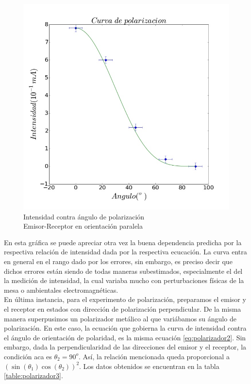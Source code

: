 \documentclass[%
 reprint,
 amsmath,amssymb,
 aps,
]{revtex4-1}
\begin{document}
\begin{figure}[h!]
\centering
\includegraphics[width=0.8\linewidth]{polarizador2}
\caption{Intensidad contra ángulo de polarización \\ Emisor-Receptor en orientación paralela}
\label{fig:polarizador2}
\end{figure}

En esta gráfica se puede apreciar otra vez la buena dependencia predicha por la respectiva relación de intensidad dada por la respectiva ecucación. La curva entra en general en el rango dado por los errores, sin embargo, es preciso decir que dichos errores están siendo de todas maneras subestimados, especialmente el del la medición de intensidad, la cual variaba mucho con perturbaciones físicas de la mesa o ambientales electromagnéticas.\\

En última instancia, para el experimento de polarización, preparamos el emisor y el receptor en estados con dirección de polarización perpendicular. De la misma manera superpusimos un polarizador metálico al que variábamos su ángulo de polarización. En este caso, la ecuación que gobierna la curva de intensidad contra el ángulo de orientación de polaridad, es la misma ecuación \ref{eq:polarizador2}. Sin embargo, dada la perpendicularidad de las direcciones del emisor y el receptor, la condición aca es $\theta_2 = 90^o$. Así, la relación mencionada queda proporcional a $\left(\sin{(\theta_1)}\cos{(\theta_2)}\right)^2$. Los datos obtenidos se encuentran en la tabla \ref{table:polarizador3}.\\
\end{document}
